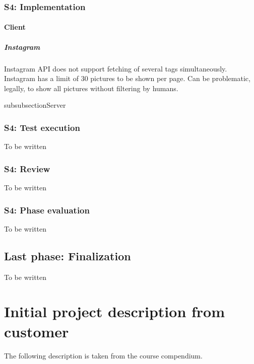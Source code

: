 \documentclass[11pt]{book}
\begin{document}
\subsection{S4: Implementation}

\subsubsection{Client}
\paragraph{Instagram}
Instagram API does not support fetching of several tags simultaneously.
Instagram has a limit of 30 pictures to be shown per page. 
Can be problematic, legally, to show all pictures without filtering by humans.

subsubsection{Server}

\subsection{S4: Test execution}
To be written
\subsection{S4: Review}
To be written
\subsection{S4: Phase evaluation}
To be written

\section{Last phase: Finalization}
To be written



\appendix
\chapter{Initial project description from customer}
The following description is taken from the course compendium\cite[p. 47]{compendium}.
\end{document}
